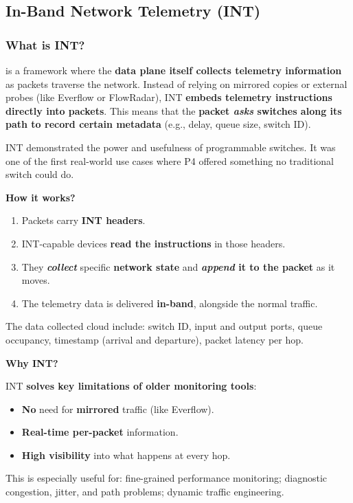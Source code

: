 \subsection{In-Band Network Telemetry (INT)}

\subsubsection{What is INT?}

 is a framework where the \textbf{data plane itself collects telemetry information} as packets traverse the network. Instead of relying on mirrored copies or external probes (like Everflow or FlowRadar), INT \textbf{embeds telemetry instructions directly into packets}. This means that the \textbf{packet \emph{asks} switches along its path to record certain metadata} (e.g., delay, queue size, switch ID).

\highspace
INT demonstrated the power and usefulness of programmable switches. It was one of the first real-world use cases where P4 offered something no traditional switch could do.

\highspace
\begin{flushleft}
    \textcolor{Green3}{ \textbf{How it works?}}
\end{flushleft}
\begin{enumerate}
    \item Packets carry \textbf{INT headers}.
    \item INT-capable devices \textbf{read the instructions} in those headers.
    \item They \textbf{\emph{collect}} specific \textbf{network state} and \textbf{\emph{append} it to the packet} as it moves.
    \item The telemetry data is delivered \textbf{in-band}, alongside the normal traffic.
\end{enumerate}
The data collected cloud include: switch ID, input and output ports, queue occupancy, timestamp (arrival and departure), packet latency per hop.

\highspace
\begin{flushleft}
    \textcolor{Green3}{ \textbf{Why INT?}}
\end{flushleft}
INT \textbf{solves key limitations of older monitoring tools}:
\begin{itemize}[label=\textcolor{Green3}{}]
    \item \textbf{No} need for \textbf{mirrored} traffic (like Everflow).
    \item \textbf{Real-time per-packet} information.
    \item \textbf{High visibility} into what happens at every hop.
\end{itemize}
This is especially useful for: fine-grained performance monitoring; diagnostic congestion, jitter, and path problems; dynamic traffic engineering.